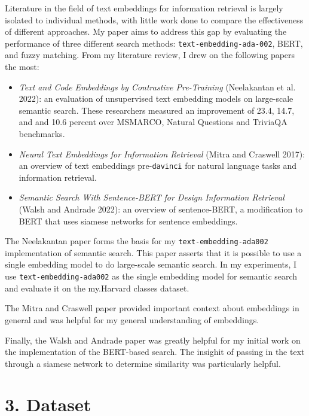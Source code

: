 \documentclass[
	a4paper, %
	10pt, %
	unnumberedsections, %
	twoside, %
]{LTJournalArticle}
\begin{document}
Literature in the field of text embeddings for information retrieval is largely isolated to individual methods, with little work done to compare the effectiveness of different approaches. My paper aims to address this gap by evaluating the performance of three different search methods: \texttt{text-embedding-ada-002}, BERT, and fuzzy matching. From my literature review, I drew on the following papers the most: 


\begin{itemize}
	\item \textit{Text and Code Embeddings by Contrastive Pre-Training} (Neelakantan et al. 2022): an evaluation of unsupervised text embedding models on large-scale semantic search. These researchers measured an improvement of 23.4, 14.7, and and 10.6 percent over MSMARCO, Natural Questions and TriviaQA benchmarks. 
	\item \textit{Neural Text Embeddings for Information Retrieval} (Mitra and Craswell 2017): an overview of text embeddings pre-\texttt{davinci} for natural language tasks and information retrieval. 
	\item \textit{Semantic Search With Sentence-BERT for Design Information Retrieval} (Walsh and Andrade 2022): an overview of sentence-BERT, a modification to BERT that uses siamese networks for sentence embeddings. 
\end{itemize}

The Neelakantan paper forms the basis for my \texttt{text-embedding-ada002} implementation of semantic search. This paper asserts that it is possible to use a single embedding model to do large-scale semantic search. In my experiments, I use \texttt{text-embedding-ada002}  as the single embedding model for semantic search and evaluate it on the my.Harvard classes dataset. 

The Mitra and Craswell paper provided important context about embeddings in general and was helpful for my general understanding of embeddings.

Finally, the Walsh and Andrade paper was greatly helpful for my initial work on the implementation of the BERT-based search. The insighit of passing in the text through a siamese network to determine similarity was particularly helpful. 

\section{3. Dataset}
\end{document}
